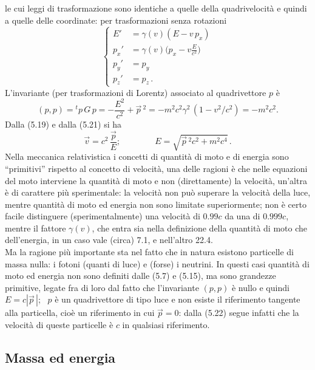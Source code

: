le cui leggi di trasformazione sono identiche a quelle della quadrivelocit\`a e
quindi a quelle delle coordinate: per trasformazioni senza rotazioni
\begin{equation}
  \left\{\begin{aligned}
    E'&=\gamma(v)(E-v\,p_x)\\
    p_x'&=\gamma(v)\Big(p_x-v\frac{E}{c^2}\Big)\\
    p_y'&=p_y\\
    p_z'&=p_z\,.
  \end{aligned}\right.
  \tag{5.20}
\end{equation}
L'invariante (per trasformazioni di Lorentz) associato al quadrivettore $p$ \`e
\begin{equation}
  (p,p)={}^tp\,G\,p=-\frac{E^2}{c^2}+\vec p\,^2
  =-m^2c^2\gamma^2\,(1-v^2/c^2)=-m^2c^2.
  \tag{5.21}
\end{equation}
Dalla (5.19) e dalla (5.21) si ha
\begin{equation}
  \vec v=c^2\,\frac{\vec p}{E};\qquad\qquad E=\sqrt{\vec p\,^2c^2+m^2c^4}\,.
  \tag{5.22}
\end{equation}
Nella meccanica relativistica i concetti di quantit\`a di moto e di energia sono
``primitivi'' rispetto al concetto di velocit\`a, una delle ragioni \`e che
nelle equazioni del moto interviene la quantit\`a di moto e non (direttamente)
la velocit\`a, un'altra \`e di carattere pi\`u sperimentale: la velocit\`a non
pu\`o superare la velocit\`a della luce, mentre quantit\`a di moto ed energia
non sono limitate superiormente; non \`e certo facile distinguere
(sperimentalmente) una velocit\`a di $0.99c$ da una di $0.999c$, mentre il
fattore $\gamma(v)$, che entra sia nella definizione della quantit\`a di moto
che dell'energia, in un caso vale (circa) 7.1, e nell'altro 22.4.\\
Ma la ragione pi\`u importante sta nel fatto che in natura esistono particelle
di massa nulla: i fotoni (quanti di luce) e (forse) i neutrini. In questi casi
quantit\`a di moto ed energia non sono definiti dalle (5.7) e (5.15), ma sono
grandezze primitive, legate fra di loro dal fatto che l'invariante $(p,p)$ \`e
nullo e quindi \ $E=c|\vec p\,|$; \ $p$ \`e un quadrivettore di tipo luce e non
esiste il riferimento tangente alla particella, cio\`e un riferimento in cui
$\vec p=0$: dalla (5.22) segue infatti che la velocit\`a di queste particelle
\`e $c$ in qualsiasi riferimento.

\subsection{Massa ed energia}

